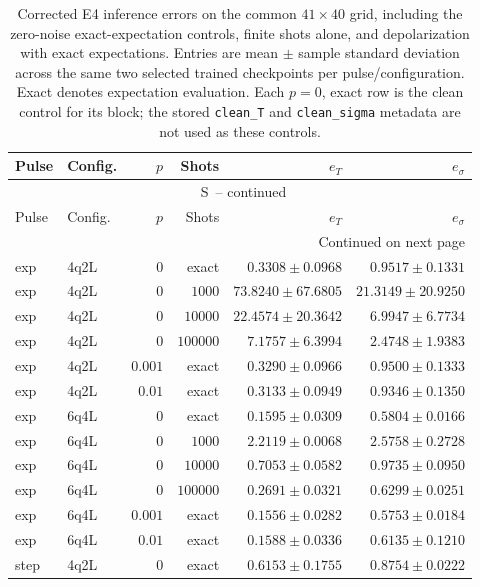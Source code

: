 \documentclass[11pt]{article}
\renewcommand{\thetable}{S\arabic{table}}
\begin{document}
\FloatBarrier
\begingroup\footnotesize
\setlength{\tabcolsep}{4pt}
\setlength{\LTcapwidth}{\textwidth}
\begin{longtable}{llrrrr}
\caption{Corrected E4 inference errors on the common $41\times40$ grid, including the zero-noise exact-expectation controls, finite shots alone, and depolarization with exact expectations. Entries are mean $\pm$ sample standard deviation across the same two selected trained checkpoints per pulse/configuration. Exact denotes expectation evaluation. Each $p=0$, exact row is the clean control for its block; the stored \texttt{clean\_T} and \texttt{clean\_sigma} metadata are not used as these controls.}\label{tab:e4}\\
\toprule
Pulse & Config. & $p$ & Shots & $e_T$ & $e_\sigma$ \\
\midrule
\endfirsthead
\multicolumn{6}{c}{\tablename\ \thetable\ -- continued}\\
\toprule
Pulse & Config. & $p$ & Shots & $e_T$ & $e_\sigma$ \\
\midrule
\endhead
\midrule
\multicolumn{6}{r}{Continued on next page}\\
\endfoot
\bottomrule
\endlastfoot
exp & 4q2L & $0$ & exact & $0.3308\pm0.0968$ & $0.9517\pm0.1331$ \\
exp & 4q2L & $0$ & $1000$ & $73.8240\pm67.6805$ & $21.3149\pm20.9250$ \\
exp & 4q2L & $0$ & $10000$ & $22.4574\pm20.3642$ & $6.9947\pm6.7734$ \\
exp & 4q2L & $0$ & $100000$ & $7.1757\pm6.3994$ & $2.4748\pm1.9383$ \\
exp & 4q2L & $0.001$ & exact & $0.3290\pm0.0966$ & $0.9500\pm0.1333$ \\
exp & 4q2L & $0.01$ & exact & $0.3133\pm0.0949$ & $0.9346\pm0.1350$ \\
\midrule
exp & 6q4L & $0$ & exact & $0.1595\pm0.0309$ & $0.5804\pm0.0166$ \\
exp & 6q4L & $0$ & $1000$ & $2.2119\pm0.0068$ & $2.5758\pm0.2728$ \\
exp & 6q4L & $0$ & $10000$ & $0.7053\pm0.0582$ & $0.9735\pm0.0950$ \\
exp & 6q4L & $0$ & $100000$ & $0.2691\pm0.0321$ & $0.6299\pm0.0251$ \\
exp & 6q4L & $0.001$ & exact & $0.1556\pm0.0282$ & $0.5753\pm0.0184$ \\
exp & 6q4L & $0.01$ & exact & $0.1588\pm0.0336$ & $0.6135\pm0.1210$ \\
\midrule
step & 4q2L & $0$ & exact & $0.6153\pm0.1755$ & $0.8754\pm0.0222$ \\

\end{longtable}
\end{document}
